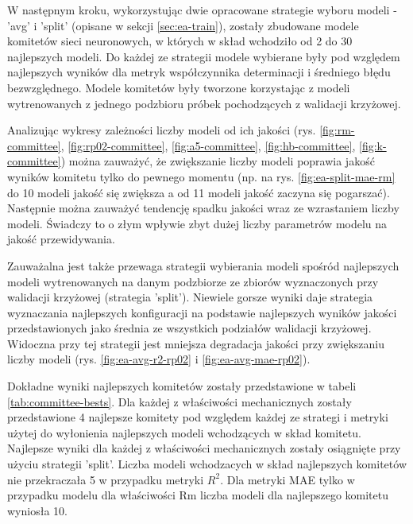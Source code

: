 \FloatBarrier

W następnym kroku, wykorzystując dwie opracowane strategie wyboru modeli - 'avg' i 'split' (opisane w sekcji \ref{sec:ea-train}), zostały zbudowane modele komitetów sieci neuronowych, w których w skład wchodziło od 2 do 30 najlepszych modeli. Do każdej ze strategii modele wybierane były pod względem najlepszych wyników dla metryk współczynnika determinacji i średniego błędu bezwzględnego. Modele komitetów były tworzone korzystając z modeli wytrenowanych z jednego podzbioru próbek pochodzących z walidacji krzyżowej.

Analizując wykresy zależności liczby modeli od ich jakości (rys. \ref{fig:rm-committee}, \ref{fig:rp02-committee}, \ref{fig:a5-committee}, \ref{fig:hb-committee}, \ref{fig:k-committee}) można zauważyć, że zwiększanie liczby modeli poprawia jakość wyników komitetu tylko do pewnego momentu (np. na rys. \ref{fig:ea-split-mae-rm} do 10 modeli jakość się zwiększa a od 11 modeli jakość zaczyna się pogarszać). Następnie można zauważyć tendencję spadku jakości wraz ze wzrastaniem liczby modeli. Świadczy to o złym wpływie zbyt dużej liczby parametrów modelu na jakość przewidywania.

Zauważalna jest także przewaga strategii wybierania modeli spośród najlepszych modeli wytrenowanych na danym podzbiorze ze zbiorów wyznaczonych przy walidacji krzyżowej (strategia 'split'). Niewiele gorsze wyniki daje strategia wyznaczania najlepszych konfiguracji na podstawie najlepszych wyników jakości przedstawionych jako średnia ze wszystkich podziałów walidacji krzyżowej. Widoczna przy tej strategii jest mniejsza degradacja jakości przy zwiększaniu liczby modeli (rys. \ref{fig:ea-avg-r2-rp02} i \ref{fig:ea-avg-mae-rp02}).

Dokładne wyniki najlepszych komitetów zostały przedstawione w tabeli \ref{tab:committee-bests}. Dla każdej z właściwości mechanicznych zostały przedstawione 4 najlepsze komitety pod względem każdej ze strategi i metryki użytej do wyłonienia najlepszych modeli wchodzących w skład komitetu. Najlepsze wyniki dla każdej z właściwości mechanicznych zostały osiągnięte przy użyciu strategii 'split'. Liczba modeli wchodzacych w skład najlepszych komitetów nie przekraczała 5 w przypadku metryki $R^{2}$. Dla metryki MAE tylko w przypadku modelu dla właściwości Rm liczba modeli dla najlepszego komitetu wyniosła 10.

